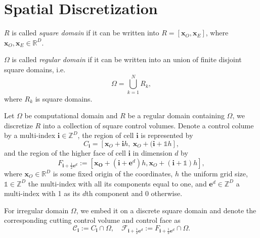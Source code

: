 \section{Spatial Discretization}
\label{sec:SpatialDiscretization}

\begin{defn}
  $R$ is called \emph{square domain} if it can be written into
  $R=[\mathbf{x}_O,\mathbf{x}_E]$, where
  $\mathbf{x}_O,\mathbf{x}_E\in\mathbb{R}^D$.
\end{defn}
\begin{defn}
  $\Omega$ is called \emph{regular domain} if it can be written into an
  union of finite disjoint square domains, i.e.
  \begin{equation}
    \Omega = \bigcup\limits_{k=1}^NR_k,
  \end{equation}
  where $R_k$ is square domains.
\end{defn}

Let $\Omega$ be computational domain and  $R$ be a regular domain
containing $\Omega$, we discretize $R$ into a
collection of square control volumes. Denote a control colume by a multi-index
$\mathbf{i}\in \mathbb{Z}^D$, the region of cell $\mathbf{i}$ is
represented by
\begin{equation}
  \label{eq:Ci}
  C_{\mathbf{i}}=\left[\mathbf{x}_O+\mathbf{i}h,\
    \mathbf{x}_O+(\mathbf{i}+\mathds{1}h\right],
\end{equation}
and the region of the higher face of cell $\mathbf{i}$ in dimension
$d$ by
\begin{equation}
  \label{eq:Fi}
  F_{\mathbf{i}+\frac{1}{2}\mathbf{e}^d}  :=
  \left[ \mathbf{\mathbf{x}_O} + \left(\mathbf{i}+\mathbf{e}^d \right)
    h, \mathbf{x}_O
    +\left(\mathbf{i}+\mathds{1}\right)h \right],
\end{equation}
where $\mathbf{x}_O\in\mathbb{R}^D$ is some fixed origin of the
coordinates, $h$ the uniform grid size, $\mathds{1}\in\mathbb{Z}^D$
the multi-index with all its components equal to one, and
$\mathbf{e}^d\in\mathbb{Z}^D$ a multi-index with 1 as its $d$th
component and 0 otherwise.

For irregular domain $\Omega$, we embed it on a discrete square
domain and  denote the corresponding cutting control volume and
control face as
\begin{equation}
  \mathcal{C}_{\mathbf{i}}:={C}_{\mathbf{i}}\cap \Omega,\quad
  \mathcal{F}_{\mathbf{i}+\frac{1}{2}\mathbf{e}^d} :=
  {F}_{\mathbf{i}+\frac{1}{2}\mathbf{e}^d}  \cap \Omega.
\end{equation}

